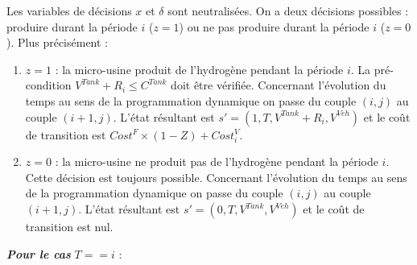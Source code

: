 \begin{enumerate}
	Les variables de décisions $x$ et $\delta$ sont neutralisées. On a deux décisions possibles : produire durant la période $i$ ($z=1$) ou ne pas produire durant la période $i$ ($z=0$). Plus précisément :
	\begin{enumerate}[label=\arabic*)]
		\item $z=1$ : la micro-usine produit de l'hydrogène pendant la période $i$. La pré-condition $V^{Tank} + R_i \leq C^{Tank}$ doit être vérifiée. Concernant l'évolution du temps au sens de la programmation dynamique on passe du couple $(i,j)$ au couple $(i+1,j)$. L'état résultant est $s'=(1, T,V^{Tank} + R_i, V^{Veh} )$ et le coût de transition est $Cost^F \times (1-Z) + Cost_i^V$.
		\item $z=0$ : la micro-usine ne produit pas de l'hydrogène pendant la période $i$. Cette décision est toujours possible. Concernant l'évolution du temps au sens de la programmation dynamique on passe du couple $(i,j)$ au couple $(i+1,j)$. L'état résultant est $s'=(0,T, V^{Tank},V^{Veh})$ et le coût de transition est nul.
	\end{enumerate}
	
\end{enumerate}




\textit{\textbf{Pour le cas}} $T==i$ :

